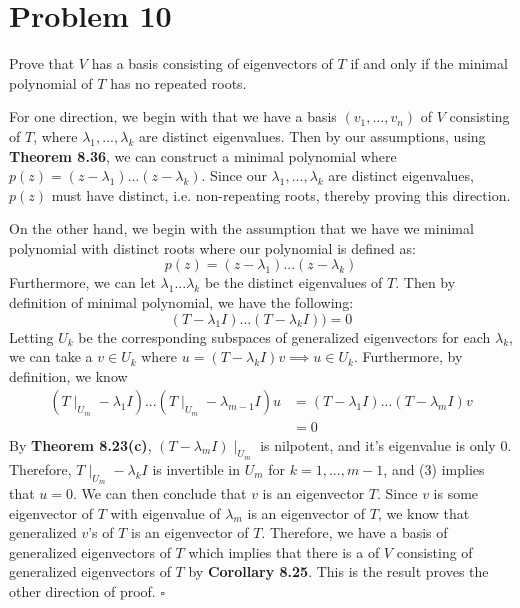 \documentclass[12pt]{article}
\newenvironment{proof}{\noindent{\bf Proof.}}{\hfill $\square$\medskip}
\begin{document}
\newpage
\section{Problem 10}
Prove that $V$ has a basis consisting of eigenvectors of $T$ if and only if the minimal polynomial of $T$ has no repeated roots.

\begin{proof}
    For one direction, we begin with that we have a basis $(v_{1},...,v_{n})$ of $V$ consisting of $T$, where  $\lambda_{1},...,\lambda_{k}$ are distinct eigenvalues. Then by our assumptions, using \textbf{Theorem 8.36}, we can construct a minimal polynomial where $p(z)=(z-\lambda_{1})...(z-\lambda_{k})$. Since our $\lambda_{1},...,\lambda_{k}$ are distinct eigenvalues, $p(z)$ must have distinct, i.e. non-repeating roots, thereby proving this direction.

    On the other hand, we begin with the assumption that we have we minimal polynomial with distinct roots where our polynomial is defined as:
    $$p(z)=(z-\lambda_{1})...(z-\lambda_{k})$$
    Furthermore, we can let $\lambda_{1}...\lambda_{k}$ be the distinct eigenvalues of $T$. Then by definition of minimal polynomial, we have the following:
    $$(T-\lambda_{1}I)...(T-\lambda_{k}I))=0$$
    Letting $U_{k}$ be the corresponding subspaces of generalized eigenvectors for each $\lambda_{k}$, we can take a $v\in U_{k}$ where $u=(T-\lambda_{k}I)v\implies u\in U_{k}$. Furthermore, by definition, we know
    \begin{equation}
        \begin{split}
            (T\mid_{U_{m}}-\lambda_{1}I)...(T\mid_{U_{m}}-\lambda_{m-1}I)u&=(T-\lambda_{1}I)...(T-\lambda_{m}I)v\\
            &=0
        \end{split}
    \end{equation}
    By \textbf{Theorem 8.23(c)}, $(T-\lambda_{m}I)\mid_{U_{m}}$ is nilpotent, and it's eigenvalue is only $0$. Therefore, $T\mid_{U_{m}}-\lambda_{k}I$ is invertible in $U_{m}$ for $k=1,...,m-1$, and (3) implies that $u=0$. We can then conclude that $v$ is an eigenvector $T$. Since $v$ is some eigenvector of $T$ with eigenvalue of $\lambda_{m}$ is an eigenvector of $T$, we know that generalized $v$'s of $T$ is an eigenvector of $T$. Therefore, we have a basis of generalized eigenvectors of $T$ which implies that there is a of $V$ consisting of generalized eigenvectors of $T$ by \textbf{Corollary 8.25}. This is the result proves the other direction of proof.
\end{proof}
\end{document}
